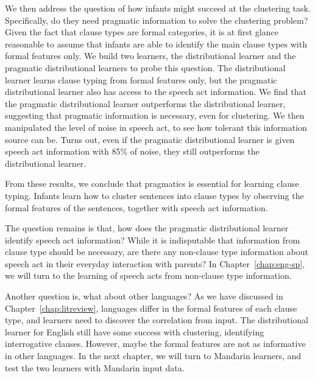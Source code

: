 We then address the question of how infants might succeed at the clustering task. Specifically, do they need pragmatic information to solve the clustering problem? Given the fact that clause types are formal categories, it is at first glance reasonable to assume that infants are able to identify the main clause types with formal features only. We build two learners, the distributional learner and the pragmatic distributional learners to probe this question. The distributional learner learns clause typing from formal features only, but the pragmatic distributional learner also has access to the speech act information. We find that the pragmatic distributional learner outperforms the distributional learner, suggesting that pragmatic information is necessary, even for clustering. We then manipulated the level of noise in speech act, to see how tolerant this information source can be. Turns out, even if the pragmatic distributional learner is given speech act information with 85\% of noise, they still outperforms the distributional learner. 

From these results, we conclude that pragmatics is essential for learning clause typing. Infants learn how to cluster sentences into clause types by observing the formal features of the sentences, together with speech act information.



The question remains is that, how does the pragmatic distributional learner identify speech act information? While it is indisputable that information from clause type should be necessary, are there any non-clause type information about speech act in their everyday interaction with parents? In Chapter~\ref{chap:eng-sp}, we will turn to the learning of speech acts from non-clause type information.


Another question is, what about other languages? As we have discussed in Chapter~\ref{chap:litreview}, languages differ in the formal features of each clause type, and learners need to discover the correlation from input. The distributional learner for English still have some success with clustering, identifying interrogative clauses. However, maybe the formal features are not as informative in other languages. In the next chapter, we will turn to Mandarin learners, and test the two learners with Mandarin input data. 

